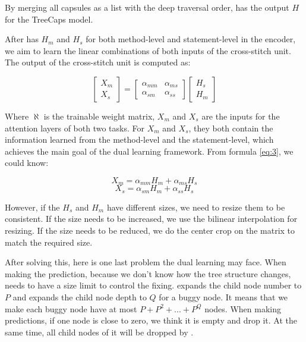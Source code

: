 By merging all capsules as a list with the deep traversal order, \tool has the output $H$ for the TreeCaps model.

After \tool has $H_m$ and $H_s$ for both method-level and statement-level in the encoder, we aim to learn the linear combinations of both inputs of the cross-stitch unit. The output of the cross-stitch unit is computed as:

\begin{equation}\label{eq:3}
	\begin{bmatrix}
		X_m\\
		X_s
	\end{bmatrix}
	=
	\begin{bmatrix}
		\alpha_{mm} &  \alpha_{ms} \\
		\alpha_{sm} &  \alpha_{ss}
	\end{bmatrix}
	\begin{bmatrix}
		H_s\\
		H_m
	\end{bmatrix}
\end{equation}

Where $\aleph$ is the trainable weight matrix, $X_m$ and $X_s$ are the inputs for the attention layers of both two tasks. For $X_m$ and $X_s$, they both contain the information learned from the method-level and the statement-level, which achieves the main goal of the dual learning framework. From formula \ref{eq:3}, we could know:

\begin{equation}\label{eq:4}
	X_m = \alpha_{mm}H_m + \alpha_{ms}H_s
\end{equation}
\begin{equation}\label{eq:5}
	X_s = \alpha_{sm}H_m + \alpha_{ss}H_s
\end{equation}

However, if the $H_s$ and $H_m$ have different sizes, we need to resize them to be consistent. If the size needs to be increased, we use the bilinear interpolation for resizing. If the size needs to be reduced, we do the center crop on the matrix to match the required size.

After solving this, here is one last problem the dual learning may face. When making the prediction, because we don't know how the tree structure changes, \tool needs to have a size limit to control the fixing. \tool expands the child node number to $P$ and expands the child node depth to $Q$ for a buggy node. It means that we make each buggy node have at most $P+P^2+...+P^Q$ nodes. When making predictions, if one node is close to zero, we think it is empty and drop it. At the same time, all child nodes of it will be dropped by \tool.